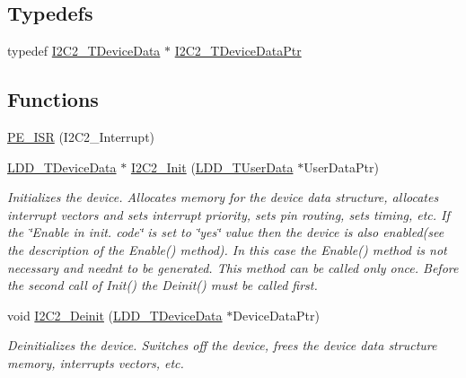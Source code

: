\subsection*{Typedefs}
\begin{DoxyCompactItemize}
\item 
typedef \hyperlink{struct_i2_c2___t_device_data}{I2\+C2\+\_\+\+T\+Device\+Data} $\ast$ \hyperlink{group___i2_c2__module_ga8699213d2cea6eac9e378ccb8a2b1ec7}{I2\+C2\+\_\+\+T\+Device\+Data\+Ptr}
\end{DoxyCompactItemize}
\subsection*{Functions}
\begin{DoxyCompactItemize}
\item 
\hyperlink{group___i2_c2__module_gacfc85cd0808af72048c90bf9b64850bb}{P\+E\+\_\+\+I\+SR} (I2\+C2\+\_\+\+Interrupt)
\item 
\hyperlink{group___p_e___types__module_gac5cf1362f1f0e3a2ce71b1bf2276d091}{L\+D\+D\+\_\+\+T\+Device\+Data} $\ast$ \hyperlink{group___i2_c2__module_gaedf92a853b529ab46925ac39933f5033}{I2\+C2\+\_\+\+Init} (\hyperlink{group___p_e___types__module_ga0b66a73f87238a782318aa0be7578e35}{L\+D\+D\+\_\+\+T\+User\+Data} $\ast$User\+Data\+Ptr)
\begin{DoxyCompactList}\small\item\em Initializes the device. Allocates memory for the device data structure, allocates interrupt vectors and sets interrupt priority, sets pin routing, sets timing, etc. If the \char`\"{}\+Enable in init. code\char`\"{} is set to \char`\"{}yes\char`\"{} value then the device is also enabled(see the description of the Enable() method). In this case the Enable() method is not necessary and needn\textquotesingle{}t to be generated. This method can be called only once. Before the second call of Init() the Deinit() must be called first. \end{DoxyCompactList}\item 
void \hyperlink{group___i2_c2__module_gae001dbec802cf15fd903e13dad2bd54d}{I2\+C2\+\_\+\+Deinit} (\hyperlink{group___p_e___types__module_gac5cf1362f1f0e3a2ce71b1bf2276d091}{L\+D\+D\+\_\+\+T\+Device\+Data} $\ast$Device\+Data\+Ptr)
\begin{DoxyCompactList}\small\item\em Deinitializes the device. Switches off the device, frees the device data structure memory, interrupts vectors, etc. \end{DoxyCompactList}\item 

\end{DoxyCompactItemize}
